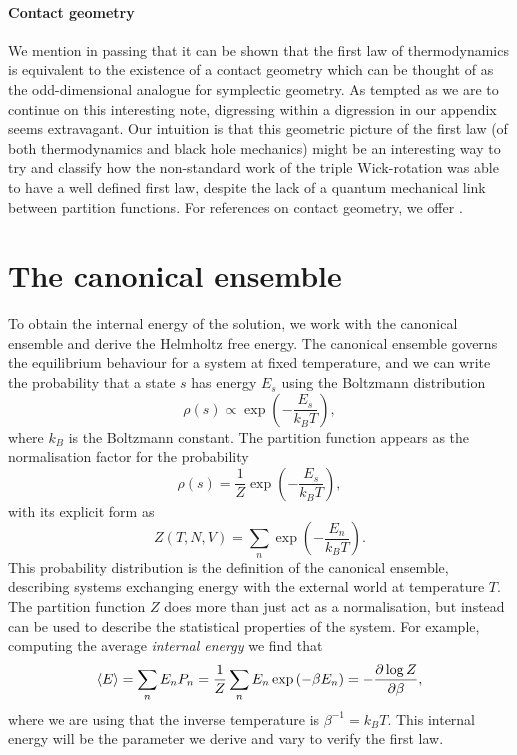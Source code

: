 \paragraph{Contact geometry} We mention in passing that it can be shown that the first law of thermodynamics is equivalent to the existence of a contact geometry which can be thought of as the odd-dimensional analogue for symplectic geometry. As tempted as we are to continue on this interesting note, digressing within a digression in our appendix seems extravagant. Our intuition is that this geometric picture of the first law (of both thermodynamics and black hole mechanics) might be an interesting way to try and classify how the non-standard work of the triple Wick-rotation was able to have a well defined first law, despite the lack of a quantum mechanical link between partition functions. For references on contact geometry, we offer \cite{arnoldcontact, Bravetti:2018rts}.

\section{The canonical ensemble}

To obtain the internal energy of the solution, we work with the canonical ensemble and derive the Helmholtz free energy. The canonical ensemble governs the equilibrium behaviour for a system at fixed temperature, and we can write the probability that a state $s$ has energy $E_s$ using the Boltzmann distribution
\begin{equation*}
	\rho(s) \propto \exp \left( - \frac{E_s}{k_B T} \right),
\end{equation*}
where $k_B$ is the Boltzmann constant. The partition function appears as the normalisation factor for the probability
\begin{equation*}
	\rho(s) = \frac{1}{Z} \exp \left( - \frac{E_s}{k_B T} \right),
\end{equation*} 
with its explicit form as
\begin{equation*}
	Z(T, N, V) = \sum_n \exp \left( - \frac{E_n}{k_B T} \right).
\end{equation*}
This probability distribution is the definition of the canonical ensemble, describing systems exchanging energy with the external world at temperature $T$. The partition function $Z$ does more than just act as a normalisation, but instead can be used to describe the statistical properties of the system. For example, computing the average \emph{internal energy} we find that  
\begin{equation}
\label{eq:canonicalinternal}
	\langle E \rangle  = \sum_n E_n P_n = \frac{1}{Z} \sum_n E_n \exp \left( - \beta E_n \right) = - \frac{\partial \log Z}{\partial \beta},
\end{equation}
where we are using that the inverse temperature is $\beta^{-1} = k_B T$. This internal energy will be the parameter we derive and vary to verify the first law.

